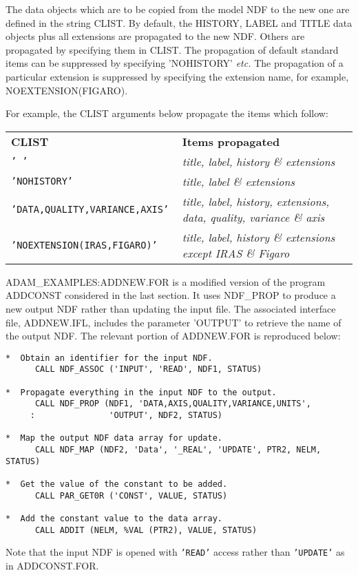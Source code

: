 The data objects which are to be copied from the model NDF to the
new one are defined in the string CLIST.
By default, the HISTORY, LABEL and TITLE 
data objects plus all extensions
are propagated to the new NDF.
Others are propagated by specifying them in CLIST.
The propagation of default standard items can be suppressed by 
specifying 'NOHISTORY' {\it etc.}
The propagation of a particular extension is suppressed by specifying the 
extension name, for example, NOEXTENSION(FIGARO).

For example, the CLIST arguments below propagate the items which follow:

\begin{tabular}{ll}
{\bf{CLIST}                             }&\bf{Items propagated}\\
{\tt ' '                                }&{\sl title, label, history \& extensions}\\
{\tt 'NOHISTORY'                        }&{\sl title, label \& extensions}\\
{\tt 'DATA,QUALITY,VARIANCE,AXIS'       }&{\sl title, label, history, extensions, data, quality, variance \& axis}\\
{\tt 'NOEXTENSION(IRAS,FIGARO)'         }&{\sl title, label, history \& extensions except IRAS \& Figaro}\\
\end{tabular}

ADAM\_EXAMPLES:ADDNEW.FOR is 
a modified version of the program ADDCONST considered in the last section.
It uses NDF\_PROP to produce a new output NDF rather than updating the input 
file.
The associated interface file, ADDNEW.IFL, includes the
parameter 'OUTPUT' to retrieve the name of  the output NDF.
The relevant portion of ADDNEW.FOR is reproduced below:
\begin{verbatim}
*  Obtain an identifier for the input NDF.
      CALL NDF_ASSOC ('INPUT', 'READ', NDF1, STATUS)           

*  Propagate everything in the input NDF to the output.
      CALL NDF_PROP (NDF1, 'DATA,AXIS,QUALITY,VARIANCE,UNITS',
     :               'OUTPUT', NDF2, STATUS)
                                                              
*  Map the output NDF data array for update.
      CALL NDF_MAP (NDF2, 'Data', '_REAL', 'UPDATE', PTR2, NELM, STATUS)
                                            
*  Get the value of the constant to be added.
      CALL PAR_GET0R ('CONST', VALUE, STATUS)

*  Add the constant value to the data array.
      CALL ADDIT (NELM, %VAL (PTR2), VALUE, STATUS)             
\end{verbatim}
Note that the input NDF is opened with {\tt 'READ'} access rather than
{\tt 'UPDATE'} as in ADDCONST.FOR.

